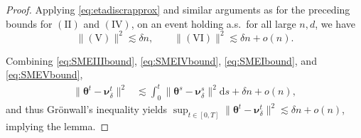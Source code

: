 \documentclass[11pt,letterpaper,reqno]{amsart}
\theoremstyle{definition}
\def\d{\mathrm{d}}
\def\btheta{\boldsymbol{\theta}}
\def\bnu{\boldsymbol{\nu}}
\newcommand{\norm}[1]{\|#1\|}
\begin{document}
\begin{proof}
Applying \eqref{eq:etadiscrapprox} and similar arguments as for
the preceding bounds for $\mathrm{(II)}$ and $\mathrm{(IV)}$, on an event
holding a.s.\ for all large $n,d$, we have
\begin{equation}\label{eq:SMEVbound}
    \norm{\mathrm{(V)}}^2 \lesssim \delta n,
\qquad
    \norm{\mathrm{(VI)}}^2 \lesssim \delta n+o(n).
\end{equation}

Combining \eqref{eq:SMEIIIbound}, \eqref{eq:SMEIVbound},
\eqref{eq:SMEIbound}, and \eqref{eq:SMEVbound},
\begin{align*}
    \norm{\btheta^t - \bnu_\delta^t}^2&\lesssim 
    \int_0^t \norm{\btheta^s-\bnu_\delta^s}^2 \d s + \delta n + o(n),
\end{align*}
and thus Gr\"onwall's inequality yields $\sup_{t \in [0,T]}
\norm{\btheta^t - \bnu_\delta^t}^2 \lesssim \delta n+o(n)$, implying the lemma.
\end{proof}
\end{document}
